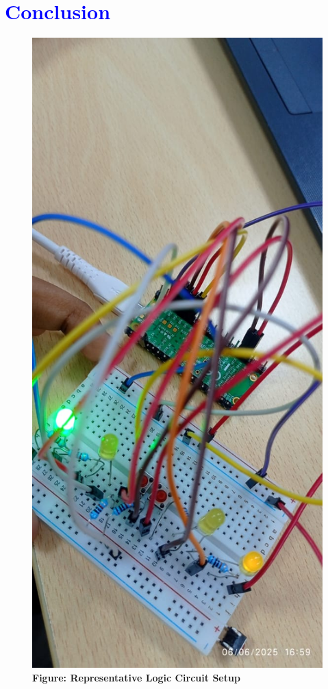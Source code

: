 \documentclass[twocolumn]{article}
\begin{document}
\section*{\textcolor{blue}{Conclusion}}
\begin{figure}[h]
    \centering
    \includegraphics[width=0.9\linewidth]{avr_gcc.jpg}
        \caption*{\textbf{Figure: Representative Logic Circuit Setup}}
\end{figure}
\end{document}
